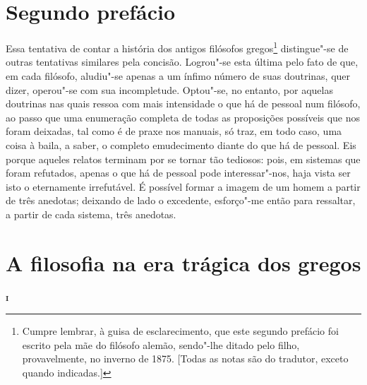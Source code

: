 \chapter{Segundo prefácio}

Essa tentativa de contar a história dos antigos filósofos
 gregos\footnote{Cumpre lembrar, à guisa de esclarecimento, que este segundo
 prefácio foi escrito pela mãe do filósofo alemão, sendo"-lhe ditado pelo
 filho, provavelmente, no inverno de 1875. [Todas as notas são do tradutor,
 exceto quando indicadas.]} distingue"-se de outras tentativas similares pela
 concisão. Logrou"-se esta última pelo fato de que, em cada filósofo,
 aludiu"-se apenas a um ínfimo número de suas doutrinas, quer dizer,
 operou"-se com sua incompletude. Optou"-se, no entanto, por aquelas
 doutrinas nas quais ressoa com mais intensidade o que há de pessoal num
 filósofo, ao passo que uma enumeração completa de todas as proposições
 possíveis que nos foram deixadas, tal como é de praxe nos manuais, só traz,
 em todo caso, uma coisa à baila, a saber, o completo emudecimento diante do
 que há de pessoal. Eis porque aqueles relatos terminam por se tornar tão
 tediosos: pois, em sistemas que foram refutados, apenas o que há de pessoal
 pode interessar"-nos, haja vista ser isto o eternamente irrefutável. É
 possível formar a imagem de um homem a partir de três anedotas; deixando de
 lado o excedente, esforço"-me então para ressaltar, a partir de cada
 sistema, três anedotas.

\chapter{A filosofia na era trágica dos gregos}

\textsc{\textbf{i}}
\bigskip

